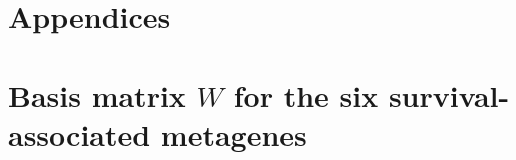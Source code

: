 \documentclass[dissertation.tex]{subfiles}
\begin{document}
\appendix
{}
\section*{Appendices}
\section{Basis matrix $W$ for the six survival-associated metagenes}
\label{app:sigs-w-matrix}

\label{app:sigs-w-matrix-end}
\end{document}
